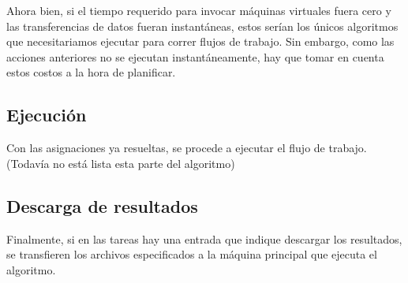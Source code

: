 Ahora bien, si el tiempo requerido para invocar máquinas virtuales fuera cero y las transferencias de datos fueran instantáneas, estos serían los únicos algoritmos que necesitariamos ejecutar para correr flujos de trabajo. Sin embargo, como las acciones anteriores no se ejecutan instantáneamente, hay que tomar en cuenta estos costos a la hora de planificar.




\subsection{Ejecución}

Con las asignaciones ya resueltas, se procede a ejecutar el flujo de trabajo. (Todavía no está lista esta parte del algoritmo)


\subsection{Descarga de resultados}

Finalmente, si en las tareas hay una entrada que indique descargar los resultados, se transfieren los archivos especificados a la máquina principal que ejecuta el algoritmo.
